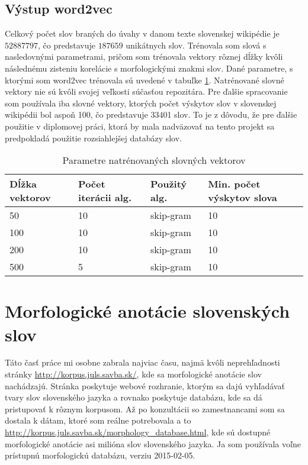 \documentclass[12pt]{article}
\begin{document}
\subsection{Výstup word2vec}
Celkový počet slov braných do úvahy v danom texte slovenskej wikipédie je $52887797$, čo predstavuje $187659$ unikátnych slov. Trénovala som slová s nasledovnými parametrami, pričom som trénovala vektory rôznej dĺžky kvôli následnému zisteniu korelácie s morfologickými znakmi slov. 
Dané parametre, s ktorými som word2vec trénovala sú uvedené v tabuľke \ref{tab:v}. Natrénované slovné vektory nie sú kvôli svojej veľkosti súčasťou repozitára. Pre ďalšie spracovanie som používala iba slovné vektory, ktorých počet výskytov slov v slovenskej wikipédii bol aspoň 100, čo predstavuje 33401 slov. To je z dôvodu, že pre ďalšie použitie v diplomovej práci, ktorá by mala nadväzovať na tento projekt sa predpokladá použitie rozsiahlejšej databázy slov. 

\begin{table}
\begin{tabular}{|l|l|l|l|}
\hline
Dĺžka vektorov & Počet iterácii alg. & Použitý alg. & Min. počet výskytov slova \\ \hline
50 & 10 & skip-gram & 10 \\ 
100 & 10 & skip-gram & 10 \\ 
200 & 10 & skip-gram & 10 \\ 
500 & 5 & skip-gram & 10 \\
\hline
\end{tabular}
\caption{Parametre natrénovaných slovných vektorov}\label{tab:v}
\end{table}

\section{Morfologické anotácie slovenských slov}

Táto časť práce mi osobne zabrala najviac času, najmä kvôli neprehľadnosti stránky \url{http://korpus.juls.savba.sk/}, kde sa morfologické anotácie slov nachádzajú. Stránka poskytuje webové rozhranie, ktorým sa dajú vyhľadávať tvary slov slovenského jazyka a rovnako poskytuje databázu, kde sa dá pristupovať k rôznym korpusom. Až po konzultácii so zamestnancami som sa dostala k dátam, ktoré som reálne potrebovala a to \url{http://korpus.juls.savba.sk/morphology_database.html}, kde sú dostupné morfologické anotácie asi milióna slov slovenského jazyka. Ja som používala voľne prístupnú morfologickú databázu, verziu 2015-02-05. 
\end{document}
